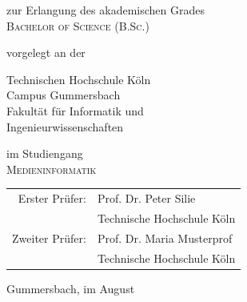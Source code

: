 \begin{titlepage}
\begin{center}
\vspace{1.0cm}

\begin{large}
zur Erlangung des akademischen Grades\\
\vspace{0.2cm}
\textsc{Bachelor of Science (B.Sc.)}\\ 
\end{large}

\vspace{0.4cm}

\begin{large}
vorgelegt an der\\ 
\vspace{0.2cm}
\begin{scshape}
Technischen Hochschule Köln\\
Campus Gummersbach\\
Fakultät für Informatik und\\
Ingenieurwissenschaften\\
\end{scshape}
\end{large}

\vspace{0.4cm}

\begin{large}
im Studiengang\\ 
\vspace{0.2cm}
\textsc{Medieninformatik}
\end{large}


\vspace{1.0cm}

\begin{tabular}{rl}
        Erster Prüfer:  &  Prof. Dr. Peter Silie\\
       					&  \small Technische Hochschule Köln \\[1.0em]
       Zweiter Prüfer:  &  Prof. Dr. Maria Musterprof\\
       					&  \small Technische Hochschule Köln\\
\end{tabular}

\vspace{0.6cm}

\begin{large}
Gummersbach, im August \the\year
\end{large}


\end{center}
\end{titlepage}
